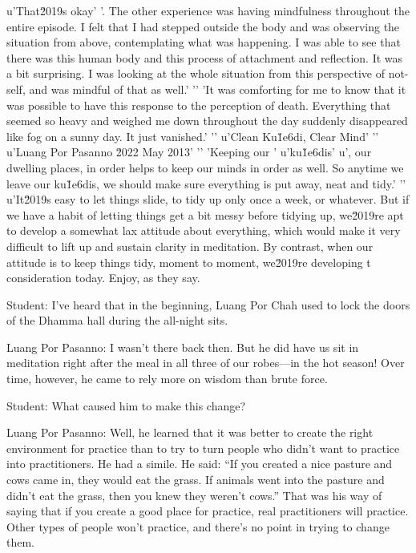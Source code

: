 u'That\u2019s okay'
'. The other experience was having mindfulness throughout the entire episode. I felt that I had stepped outside the body and was observing the situation from above, contemplating what was happening. I was able to see that there was this human body and this process of attachment and reflection. It was a bit surprising. I was looking at the whole situation from this perspective of not-self, and was mindful of that as well.'
'\n'
'It was comforting for me to know that it was possible to have this response to the perception of death. Everything that seemed so heavy and weighed me down throughout the day suddenly disappeared like fog on a sunny day. It just vanished.'
'\n'
u'Clean Ku\u1e6di, Clear Mind'
'\n'
u'Luang Por Pasanno \u2022 May 2013'
'\n'
'Keeping our '
u'ku\u1e6dis'
u', our dwelling places, in order helps to keep our minds in order as well. So anytime we leave our ku\u1e6dis, we should make sure everything is put away, neat and tidy.'
'\n'
u'It\u2019s easy to let things slide, to tidy up only once a week, or whatever. But if we have a habit of letting things get a bit messy before tidying up, we\u2019re apt to develop a somewhat lax attitude about everything, which would make it very difficult to lift up and sustain clarity in meditation. By contrast, when our attitude is to keep things tidy, moment to moment, we\u2019re developing t consideration 
today. Enjoy, as they say.


Student: I've heard that in the beginning, Luang Por Chah used to lock 
the doors of the Dhamma hall during the all-night sits.

Luang Por Pasanno: I wasn't there back then. But he did have us sit in 
meditation right after the meal in all three of our robes---in the hot 
season! Over time, however, he came to rely more on wisdom than brute 
force.

Student: What caused him to make this change?

Luang Por Pasanno: Well, he learned that it was better to create the 
right environment for practice than to try to turn people who didn't 
want to practice into practitioners. He had a simile. He said: ``If you 
created a nice pasture and cows came in, they would eat the grass. If 
animals went into the pasture and didn't eat the grass, then you knew 
they weren't cows.'' That was his way of saying that if you create a 
good place for practice, real practitioners will practice. Other types 
of people won't practice, and there's no point in trying to change them.

